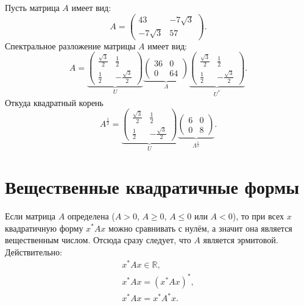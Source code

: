 \begin{example}
    Пусть матрица $A$ имеет вид:
    \[
        A
        = \begin{pmatrix}
              43          & -7 \sqrt{3} \\
              -7 \sqrt{3} & 57
        \end{pmatrix} .
    \]
    Спектральное разложение матрицы $A$ имеет вид:
    \[
        A
        =
        \underbrace{
            \begin{pmatrix}
                \frac{\sqrt{3}}{2} & \frac{1}{2}         \\
                \frac{1}{2}        & -\frac{\sqrt{3}}{2}
            \end{pmatrix}
        }_{U}
        \underbrace{
            \begin{pmatrix}
                36 & 0  \\
                0  & 64
            \end{pmatrix}
        }_{\Lambda}
        \underbrace{
            \begin{pmatrix}
                \frac{\sqrt{3}}{2} & \frac{1}{2}         \\
                \frac{1}{2}        & -\frac{\sqrt{3}}{2}
            \end{pmatrix}
        }_{U^*} .
    \]
    Откуда квадратный корень
    \[
        A^\frac{1}{2}
        =
        \underbrace{
            \begin{pmatrix}
                \frac{\sqrt{3}}{2} & \frac{1}{2}         \\
                \frac{1}{2}        & -\frac{\sqrt{3}}{2}
            \end{pmatrix}
        }_{U}
        \underbrace{
            \begin{pmatrix}
                6 & 0  \\
                0  & 8
            \end{pmatrix}
        }_{\Lambda^\frac{1}{2}} .
    \]
\end{example}


\section{Вещественные квадратичные формы}

Если матрица $A$ определена ($A > 0$, $A \ge 0$, $A \le 0$ или $A < 0$), то при всех $x$ квадратичную форму $x^* A x$ можно сравнивать с нулём, а значит она является
вещественным числом. Отсюда сразу следует, что $A$ является эрмитовой. Действительно:
\begin{gather*}
    x^* A x \in \mathbb{R} , \\
    x^* A x = ( x^* A x )^* , \\
    x^* A x = x^* A^* x .
\end{gather*}

